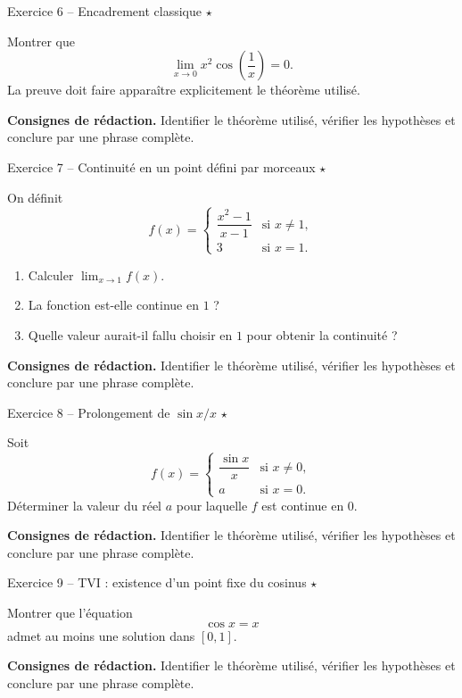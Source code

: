 \documentclass[11pt,a4paper]{article}
\newcommand{\etoiles}[1]{\hfill\textcolor{orangeprepa}{\textbf{#1}}}
\begin{document}
\begin{exobox}{Exercice 6 -- Encadrement classique \etoiles{$\star$}}

Montrer que
\[
\lim_{x\to0}x^2\cos\left(\frac1x\right)=0.
\]
La preuve doit faire apparaître explicitement le théorème utilisé.

\medskip
\textbf{Consignes de rédaction.} Identifier le théorème utilisé, vérifier les hypothèses et conclure par une phrase complète.
\end{exobox}


\begin{exobox}{Exercice 7 -- Continuité en un point défini par morceaux \etoiles{$\star$}}

On définit
\[
f(x)=\begin{cases}
\dfrac{x^2-1}{x-1} & \text{si }x\neq1,\\
3 & \text{si }x=1.
\end{cases}
\]
\begin{enumerate}
\item Calculer $\lim_{x\to1}f(x)$.
\item La fonction est-elle continue en $1$ ?
\item Quelle valeur aurait-il fallu choisir en $1$ pour obtenir la continuité ?
\end{enumerate}

\medskip
\textbf{Consignes de rédaction.} Identifier le théorème utilisé, vérifier les hypothèses et conclure par une phrase complète.
\end{exobox}


\begin{exobox}{Exercice 8 -- Prolongement de $\sin x/x$ \etoiles{$\star$}}

Soit
\[
f(x)=\begin{cases}
\dfrac{\sin x}{x} & \text{si }x\neq0,\\
a & \text{si }x=0.
\end{cases}
\]
Déterminer la valeur du réel $a$ pour laquelle $f$ est continue en $0$.

\medskip
\textbf{Consignes de rédaction.} Identifier le théorème utilisé, vérifier les hypothèses et conclure par une phrase complète.
\end{exobox}


\begin{exobox}{Exercice 9 -- TVI : existence d'un point fixe du cosinus \etoiles{$\star$}}

Montrer que l'équation
\[
\cos x=x
\]
admet au moins une solution dans $[0,1]$.

\medskip
\textbf{Consignes de rédaction.} Identifier le théorème utilisé, vérifier les hypothèses et conclure par une phrase complète.
\end{exobox}
\end{document}
